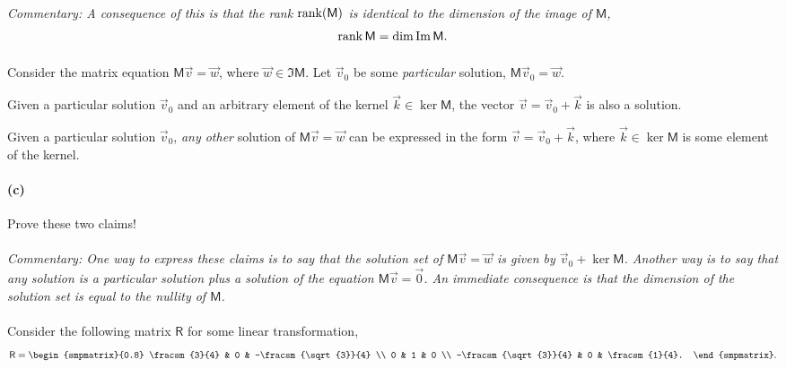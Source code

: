 \documentclass{article}
\begin{document}
\paragraph{}
\noindent\textit{Commentary: A consequence of this is that the rank $\rank(\mathsf{M})$ is identical to the dimension of the image of $\mathsf{M}$,}
	\begin{equation*}
		\rank{\mathsf{M}} = \dim\operatorname{Im}\mathsf{M}.
	\end{equation*}

	
\phline
\paragraph{}
Consider the matrix equation $\mathsf{M}\vec{v} = \vec{w}$, where $\vec{w}\in\Im\mathsf{M}$.  Let $\vec{v}_{0}$ be some \emph{particular} solution, $\mathsf{M}\vec{v}_{0} =
\vec{w}$.
	\begin{claim}
	Given a particular solution $\vec{v}_{0}$ and an arbitrary element of the kernel $\vec{k} \in \ker\mathsf{M}$, the vector $\vec{v} = \vec{v}_{0} + \vec{k}$
	is also a solution.
	\end{claim}
	\begin{claim}
	Given a particular solution $\vec{v}_{0}$, \emph{any other} solution of $\mathsf{M}\vec{v}=\vec{w}$ can be expressed in the form $\vec{v} = \vec{v}_{0}+\vec{k}$, 
	where $\vec{k}\in\ker\mathsf{M}$ is some element of the kernel.
	\end{claim}

\paragraph{(c)}		\extrapart
Prove these two claims!

\paragraph{}
\noindent\textit{Commentary: One way to express these claims is to say that the solution set of $\mathsf{M}\vec{v} = \vec{w}$ is given by $\vec{v}_{0}+\ker\mathsf{M}$.
Another way is to say that any solution is a particular solution plus a solution of the  equation $\mathsf{M}\vec{v} = \vec{0}$.
An immediate consequence is that the dimension of the solution set is equal to the nullity of $\mathsf{M}$.}

\phline
\paragraph{}
Consider the following matrix $\mathsf{R}$ for some linear transformation,
	\begin{equation*}
		\mathsf{R} = \begin{smpmatrix}{0.8} \fracsm{3}{4} & 0 & -\fracsm{\sqrt{3}}{4} \\ 0 & 1 & 0 \\ -\fracsm{\sqrt{3}}{4} & 0 & \fracsm{1}{4}. \end{smpmatrix}.
	\end{equation*}
\end{document}
